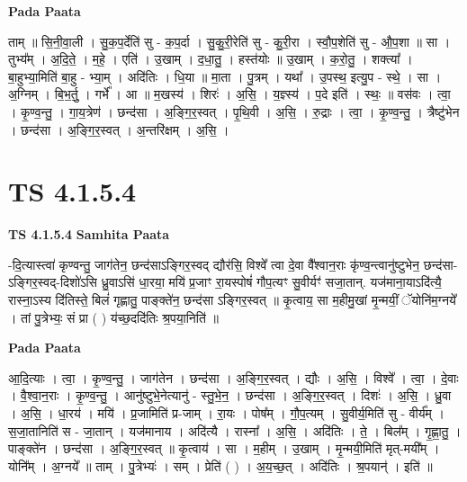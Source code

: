 \documentclass[17pt]{extarticle}
\begin{document}
\textbf{Pada Paata} \newline

ताम् ॥ सि॒नी॒वा॒ली । सु॒क॒प॒र्देति॑ सु - क॒प॒र्दा । सु॒कु॒री॒रेति॑ सु - कु॒री॒रा । स्वौ॒प॒शेति॑ सु - औ॒प॒शा ॥ सा । तुभ्य᳚म् । अ॒दि॒ते॒ । म॒हे॒ । एति॑ । उ॒खाम् । द॒धा॒तु॒ । हस्त॑योः ॥ उ॒खाम् । क॒रो॒तु॒ । शक्त्या᳚ । बा॒हुभ्या॒मिति॑ बा॒हु - भ्या॒म् । अदि॑तिः । धि॒या ॥ मा॒ता । पु॒त्रम् । यथा᳚ । उ॒पस्थ॒ इत्यु॒प - स्थे॒ । सा । अ॒ग्निम् । बि॒भ॒र्तु॒ । गर्भे᳚ । आ ॥ म॒खस्य॑ । शिरः॑ । अ॒सि॒ । य॒ज्ञ्स्य॑ । प॒दे इति॑ । स्थः॒ ॥ वस॑वः । त्वा॒ । कृ॒ण्व॒न्तु॒ । गा॒य॒त्रेण॑ । छन्द॑सा । अ॒ङ्गि॒र॒स्वत् । पृ॒थि॒वी । अ॒सि॒ । रु॒द्राः । त्वा॒ । कृ॒ण्व॒न्तु॒ । त्रैष्टु॑भेन । छन्द॑सा । अ॒ङ्गि॒र॒स्वत् । अ॒न्तरि॑क्षम् । अ॒सि॒ ।  \newline




\section*{ TS 4.1.5.4 }

\textbf{TS 4.1.5.4 } \newline
\textbf{Samhita Paata} \newline

-दि॒त्यास्त्वा॑ कृण्वन्तु॒ जाग॑तेन॒ छन्द॑साऽङ्गिर॒स्वद् द्यौर॑सि॒ विश्वे᳚ त्वा दे॒वा वै᳚श्वान॒राः कृ॑ण्व॒न्त्वानु॑ष्टुभेन॒ छन्द॑सा-ऽङ्गिर॒स्वद्-दिशो॑ऽसि ध्रु॒वाऽसि॑ धा॒रया॒ मयि॑ प्र॒जाꣳ रा॒यस्पोषं॑ गौप॒त्यꣳ सु॒वीर्यꣳ॑ सजा॒तान्. यज॑माना॒याऽदि॑त्यै॒ रास्ना॒ऽस्य दि॑तिस्ते॒ बिलं॑ गृह्णातु॒ पाङ्क्ते॑न॒ छन्द॑सा ऽङ्गिर॒स्वत् ॥ कृ॒त्वाय॒ सा म॒हीमु॒खां मृ॒न्मयीं॒ ॅयोनि॑म॒ग्नये᳚ । तां पु॒त्रेभ्यः॒ सं प्रा ( ) य॑च्छ॒ददि॑तिः श्र॒पया॒निति॑ ॥ \newline

\textbf{Pada Paata} \newline

आ॒दि॒त्याः । त्वा॒ । कृ॒ण्व॒न्तु॒ । जाग॑तेन । छन्द॑सा । अ॒ङ्गि॒र॒स्वत् । द्यौः । अ॒सि॒ । विश्वे᳚ । त्वा॒ । दे॒वाः । वै॒श्वा॒न॒राः । कृ॒ण्व॒न्तु॒ । आनु॑ष्टुभे॒नेत्यानु॑ - स्तु॒भे॒न॒ । छन्द॑सा । अ॒ङ्गि॒र॒स्वत् । दिशः॑ । अ॒सि॒ । ध्रु॒वा । अ॒सि॒ । धा॒रय॑ । मयि॑ । प्र॒जामिति॑ प्र-जाम् । रा॒यः । पोष᳚म् । गौ॒प॒त्यम् । सु॒वीर्य॒मिति॑ सु - वीर्य᳚म् । स॒जा॒तानिति॑ स - जा॒तान् । यज॑मानाय । अदि॑त्यै । रास्ना᳚ । अ॒सि॒ । अदि॑तिः । ते॒ । बिल᳚म् । गृ॒ह्णा॒तु॒ । पाङ्क्ते॑न । छन्द॑सा । अ॒ङ्गि॒र॒स्वत् ॥ कृ॒त्वाय॑ । सा । म॒हीम् । उ॒खाम् । मृ॒न्मयी॒मिति॑ मृत्-मयी᳚म् । योनि᳚म् । अ॒ग्नये᳚ ॥ ताम् । पु॒त्रेभ्यः॑ । सम् । प्रेति॑ ( ) । अ॒य॒च्छ॒त् । अदि॑तिः । श्र॒पयान्॑ । इति॑ ॥  \newline
\end{document}
